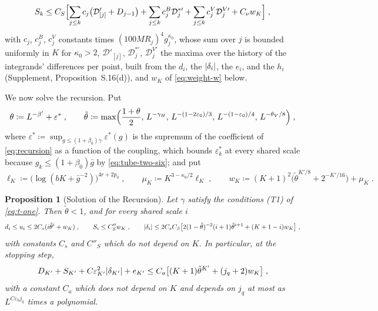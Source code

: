 \documentclass[11pt]{preprint}
\DeclarePairedDelimiter{\abs}{\lvert}{\rvert}
\numberwithin{equation}{section}
\newtheorem{proposition}[theorem]{Proposition}
\theoremstyle{definition}
\theoremstyle{remark}
\theoremstyle{plain}
\begin{document}
\begin{equation}\label{eq:r-recursion}
    S_k \leq C_S\Bigl[\sum_{j \leq k}c_j\bigl(\mathcal D'_{[j]} + D_{j-1}\bigr) + \sum_{j \leq k}c^B_j\mathcal D^{*\prime}_j + \sum_{j \leq k}c^V_j\mathcal D^{V\prime}_j + C_\nu w_K\Bigr]\;,
\end{equation}
with $c_j$, $c^B_j$, $c^V_j$ constants times $(100MR_j)^4g_j^{\kappa_0}$, whose sum over $j$ is bounded uniformly in $K$ for $\kappa_0 > 2$, $\mathcal D'_{[j]}$, $\mathcal D^{*\prime}_j$, $\mathcal D^{V\prime}_j$ the maxima over the history of the integrands' differences per point, built from the $d_i$, the $\abs{\delta_i}$, the $e_i$, and the $h_i$ (Supplement, Proposition~S.16(d)), and $w_K$ of \eqref{eq:weight-w} below.

We now solve the recursion. Put
\begin{equation}\label{eq:theta-tilde}
    \theta \coloneqq L^{-\beta'} + \varepsilon^*\;,
    \qquad
    \tilde\theta \coloneqq \max\Bigl(\frac{1 + \theta}{2},\, L^{-\gamma_H},\, L^{-(1-2\varepsilon_0)/3},\, L^{-(1-\varepsilon_0)/4},\, L^{-\theta_V/8}\Bigr)\;,
\end{equation}
where $\varepsilon^* \coloneqq \sup_{g \leq (1+\beta_0)\gamma}\varepsilon^*(g)$ is the supremum of the coefficient of \eqref{eq:recursion} as a function of the coupling, which bounds $\varepsilon^*_k$ at every shared scale because $g_k \leq (1 + \beta_0)\bar g$ by \eqref{eq:tube-two-six}; and put
\begin{equation}\label{eq:weight-w}
    \ell_K \coloneqq \bigl(\log(bK + \bar g^{-2})\bigr)^{4r+2p_0}\;,
    \qquad
    \mu_K \coloneqq K^{3-\kappa_0/2}\ell_K\;,
    \qquad
    w_K \coloneqq (K + 1)^2\bigl(\tilde\theta^{K'/8} + 2^{-K'/16}\bigr) + \mu_K\;.
\end{equation}

\begin{proposition}[Solution of the Recursion]\label{prop:recursion-solution}
Let $\gamma$ satisfy the conditions (T1) of \eqref{eq:t-one}. Then $\tilde\theta < 1$, and for every shared scale $i$
\begin{equation}\label{eq:recursion-solution}
    d_i \leq u_i \leq 2C_s(i\tilde\theta^i + w_K)\;,
    \qquad
    S_i \leq C''_Sw_K\;,
    \qquad
    \abs{\delta_i} \leq 2C_sC_\beta\bigl[2(1 - \tilde\theta)^{-2}(i + 1)\tilde\theta^{i+1} + (K + 1 - i)w_K\bigr]\;,
\end{equation}
with constants $C_s$ and $C''_S$ which do not depend on $K$. In particular, at the stopping step,
\begin{equation}\label{eq:stopping-differences}
    D_{K'} + S_{K'} + C\varepsilon_{K'}^2\abs{\delta_{K'}} + e_{K'} \leq C_a\bigl[(K + 1)\tilde\theta^{K'} + (j_q + 2)w_K\bigr]\;,
\end{equation}
with a constant $C_a$ which does not depend on $K$ and depends on $j_q$ at most as $L^{C\varepsilon_0j_q}$ times a polynomial.
\end{proposition}
\end{document}
